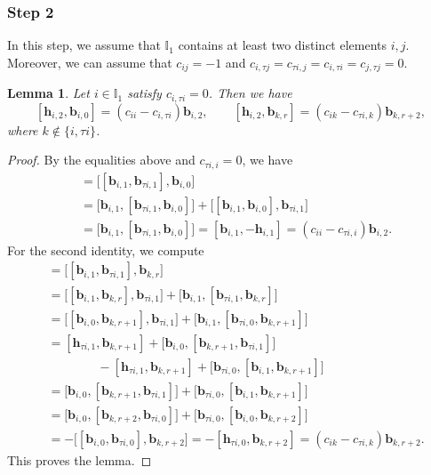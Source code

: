 \documentclass[11pt,reqno]{amsart}
\numberwithin{equation}{section}
\newtheorem{lem}[thm]{Lemma}
\theoremstyle{definition}
\theoremstyle{remark}
\newcommand{\bb}{\mathbf{b}}
\newcommand{\bh}{\mathbf{h}}
\newcommand{\I}{{\mathbb I}}
\begin{document}
\subsubsection*{\bf Step 2}
In this step, we assume that $\I_1$ contains at least two distinct elements $i,j$. Moreover, we can assume that $c_{ij}=-1$ and $c_{i,\tau j}=c_{\tau i,j}=c_{i,\tau i}=c_{j,\tau j}=0$. 


\begin{lem}\label{lem:h2bj}
Let $i\in\I_1$ satisfy $c_{i,\tau i}=0$. Then we have $$[\bh_{i,2},\bb_{i,0}]=
 (c_{ii}-c_{i,\tau i})\bb_{i,2},\qquad 
 [\bh_{i,2},\bb_{k,r}]=
 (c_{ik}-c_{\tau i,k})\bb_{k,r+2},$$ 
 where $k\notin \{i,\tau i\}$.
\end{lem}
\begin{proof}
By the equalities above and $c_{\tau i,i}=0$, we have
\begin{align*}
 [\bh_{i,2},\bb_{i,0}]
 &=
 \bigl[[\bb_{i,1},\bb_{\tau i,1}],\bb_{i,0}\bigr]
 \\
 &=
 \bigl[\bb_{i,1},[\bb_{\tau i,1},\bb_{i,0}]\bigr]
 +
 \bigl[[\bb_{i,1},\bb_{i,0}],\bb_{\tau i,1}\bigr]
 \\
 &=
 \bigl[\bb_{i,1},[\bb_{\tau i,1},\bb_{i,0}]\bigr]=
 [\bb_{i,1},-\bh_{i,1}]=
(c_{ii}-c_{\tau  i,i})\bb_{i,2}.
\end{align*}
For the second identity, we compute
\begin{align*}
 [\bh_{i,2},\bb_{k,r}]
 &=
 \bigl[[\bb_{i,1},\bb_{\tau i,1}],\bb_{k,r}\bigr]
 \\
 &=
 \bigl[[\bb_{i,1},\bb_{k,r}],\bb_{\tau i,1}\bigr]
 +
 \bigl[\bb_{i,1},[\bb_{\tau i,1},\bb_{k,r}]\bigr]
 \\
 &=
 \bigl[[\bb_{i,0},\bb_{k,r+1}],\bb_{\tau i,1}\bigr]
 +
 \bigl[\bb_{i,1},[\bb_{\tau i,0},\bb_{k,r+1}]\bigr]
 \\
 &=
 [\bh_{\tau i,1},\bb_{k,r+1}]
 +
 \bigl[\bb_{i,0},[\bb_{k,r+1},\bb_{\tau i,1}]\bigr]\\
 &\qquad\qquad-
 [\bh_{\tau i,1},\bb_{k,r+1}]
 +
 \bigl[\bb_{\tau i,0},[\bb_{i,1},\bb_{k,r+1}]\bigr]
 \\
 &=
 \bigl[\bb_{i,0},[\bb_{k,r+1},\bb_{\tau i,1}]\bigr]
 +
 \bigl[\bb_{\tau i,0},[\bb_{i,1},\bb_{k,r+1}]\bigr]
 \\
 &=
 \bigl[\bb_{i,0},[\bb_{k,r+2},\bb_{\tau i,0}]\bigr]
 +
 \bigl[\bb_{\tau i,0},[\bb_{i,0},\bb_{k,r+2}]\bigr]
 \\
 &=
 -\bigl[[\bb_{i,0},\bb_{\tau i,0}],\bb_{k,r+2}\bigr]=
 -[\bh_{\tau i,0},\bb_{k,r+2}]
=
 (c_{ik}-c_{\tau i,k})\bb_{k,r+2}.
\end{align*}
This proves the lemma.
\end{proof}
\end{document}
